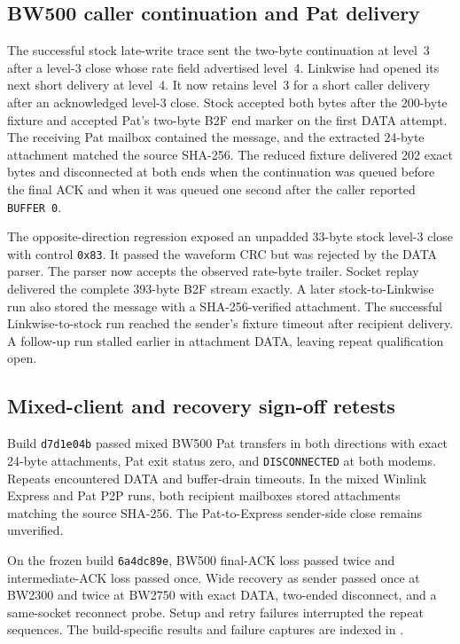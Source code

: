\documentclass[11pt,a4paper]{article}
\newcommand{\pathtext}[1]{\path{#1}}
\begin{document}
\subsection{BW500 caller continuation and Pat delivery}

The successful stock late-write trace sent the two-byte continuation
at level~3 after a level-3 close whose rate field advertised level~4.
Linkwise had opened its next short delivery at level~4. It now
retains level~3 for a short caller delivery after an acknowledged
level-3 close. Stock accepted both bytes after the 200-byte fixture
and accepted Pat's two-byte B2F end marker on the first DATA attempt.
The receiving Pat mailbox contained the message, and the extracted
24-byte attachment matched the source SHA-256.
The reduced fixture delivered 202 exact bytes and disconnected at both
ends when the continuation was queued before the final ACK and when it
was queued one second after the caller reported \texttt{BUFFER 0}.

The opposite-direction regression exposed an unpadded 33-byte stock
level-3 close with control \texttt{0x83}. It passed the waveform CRC
but was rejected by the DATA parser. The parser now accepts the
observed rate-byte trailer. Socket replay delivered the complete
393-byte B2F stream exactly. A later stock-to-Linkwise run also
stored the message with a SHA-256-verified attachment. The
successful Linkwise-to-stock run reached the sender's fixture
timeout after recipient delivery. A follow-up run stalled earlier
in attachment DATA, leaving repeat qualification open.

\subsection{Mixed-client and recovery sign-off retests}

Build \texttt{d7d1e04b} passed mixed BW500 Pat transfers in both
directions with exact 24-byte attachments, Pat exit status zero, and
\texttt{DISCONNECTED} at both modems. Repeats encountered DATA and
buffer-drain timeouts. In the mixed Winlink Express and Pat P2P runs,
both recipient mailboxes stored attachments matching the source SHA-256.
The Pat-to-Express sender-side close remains unverified.

On the frozen build \texttt{6a4dc89e}, BW500 final-ACK loss passed twice
and intermediate-ACK loss passed once. Wide recovery as sender passed
once at BW2300 and twice at BW2750 with exact DATA, two-ended disconnect,
and a same-socket reconnect probe. Setup and retry failures interrupted
the repeat sequences. The build-specific results and failure captures
are indexed in \pathtext{docs/testing/vara-interoperability.md}.
\end{document}
